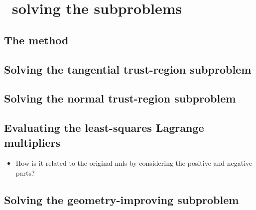 %
%
%
\chapter{ \textemdash\ solving the subproblems}
\label{ch:cobyqa-subproblems}

\section{The  method}

\section{Solving the tangential trust-region subproblem}
\label{sec:cobyqa-tangential}

\section{Solving the normal trust-region subproblem}
\label{sec:cobyqa-normal}

\section{Evaluating the least-squares Lagrange multipliers}
\label{sec:cobyqa-lagrange-multipliers}

\begin{itemize}
    \item How is it related to the original \gls{nnls} by considering the positive and negative parts?
\end{itemize}

\section{Solving the geometry-improving subproblem}
\label{sec:cobyqa-geometry-improving}
